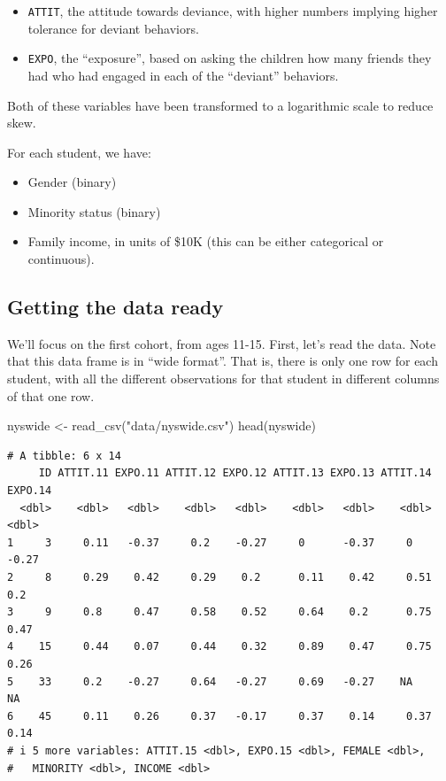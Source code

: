\documentclass[
  letterpaper,
  DIV=11,
  numbers=noendperiod]{scrreprt}
\newenvironment{Shaded}{\begin{snugshade}}{\end{snugshade}}
\newcommand{\FunctionTok}[1]{\textcolor[rgb]{0.02,0.16,0.49}{#1}}
\newcommand{\NormalTok}[1]{\textcolor[rgb]{0.00,0.44,0.13}{#1}}
\newcommand{\OtherTok}[1]{\textcolor[rgb]{0.00,0.44,0.13}{#1}}
\newcommand{\StringTok}[1]{\textcolor[rgb]{0.25,0.44,0.63}{#1}}
\providecommand{\tightlist}{%
  \setlength{\itemsep}{0pt}\setlength{\parskip}{0pt}}\usepackage{longtable,booktabs,array}
\begin{document}
\begin{itemize}
\tightlist
\item
  \texttt{ATTIT}, the attitude towards deviance, with higher numbers
  implying higher tolerance for deviant behaviors.
\item
  \texttt{EXPO}, the ``exposure'', based on asking the children how many
  friends they had who had engaged in each of the ``deviant'' behaviors.
\end{itemize}

Both of these variables have been transformed to a logarithmic scale to
reduce skew.

For each student, we have:

\begin{itemize}
\tightlist
\item
  Gender (binary)
\item
  Minority status (binary)
\item
  Family income, in units of \$10K (this can be either categorical or
  continuous).
\end{itemize}

\hypertarget{getting-the-data-ready}{%
\subsection{Getting the data ready}\label{getting-the-data-ready}}

We'll focus on the first cohort, from ages 11-15. First, let's read the
data. Note that this data frame is in ``wide format''. That is, there is
only one row for each student, with all the different observations for
that student in different columns of that one row.

\begin{Shaded}
\begin{Highlighting}[]
\NormalTok{nyswide }\OtherTok{\textless{}{-}} \FunctionTok{read\_csv}\NormalTok{(}\StringTok{"data/nyswide.csv"}\NormalTok{)}
\FunctionTok{head}\NormalTok{(nyswide)}
\end{Highlighting}
\end{Shaded}

\begin{verbatim}
# A tibble: 6 x 14
     ID ATTIT.11 EXPO.11 ATTIT.12 EXPO.12 ATTIT.13 EXPO.13 ATTIT.14 EXPO.14
  <dbl>    <dbl>   <dbl>    <dbl>   <dbl>    <dbl>   <dbl>    <dbl>   <dbl>
1     3     0.11   -0.37     0.2    -0.27     0      -0.37     0      -0.27
2     8     0.29    0.42     0.29    0.2      0.11    0.42     0.51    0.2 
3     9     0.8     0.47     0.58    0.52     0.64    0.2      0.75    0.47
4    15     0.44    0.07     0.44    0.32     0.89    0.47     0.75    0.26
5    33     0.2    -0.27     0.64   -0.27     0.69   -0.27    NA      NA   
6    45     0.11    0.26     0.37   -0.17     0.37    0.14     0.37    0.14
# i 5 more variables: ATTIT.15 <dbl>, EXPO.15 <dbl>, FEMALE <dbl>,
#   MINORITY <dbl>, INCOME <dbl>
\end{verbatim}
\end{document}
